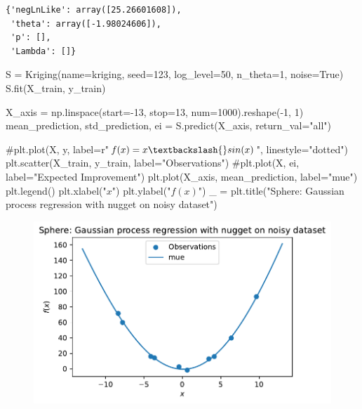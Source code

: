 \documentclass[
  letterpaper,
  DIV=11,
  numbers=noendperiod]{scrreprt}
\newenvironment{Shaded}{\begin{snugshade}}{\end{snugshade}}
\newcommand{\CommentTok}[1]{\textcolor[rgb]{0.37,0.37,0.37}{#1}}
\newcommand{\DecValTok}[1]{\textcolor[rgb]{0.68,0.00,0.00}{#1}}
\newcommand{\NormalTok}[1]{\textcolor[rgb]{0.00,0.23,0.31}{#1}}
\newcommand{\OperatorTok}[1]{\textcolor[rgb]{0.37,0.37,0.37}{#1}}
\newcommand{\StringTok}[1]{\textcolor[rgb]{0.13,0.47,0.30}{#1}}
\newcommand{\VariableTok}[1]{\textcolor[rgb]{0.07,0.07,0.07}{#1}}
\begin{document}
\begin{verbatim}
{'negLnLike': array([25.26601608]),
 'theta': array([-1.98024606]),
 'p': [],
 'Lambda': []}
\end{verbatim}

\begin{Shaded}
\begin{Highlighting}[]
\NormalTok{S }\OperatorTok{=}\NormalTok{ Kriging(name}\OperatorTok{=}\StringTok{\textquotesingle{}kriging\textquotesingle{}}\NormalTok{,}
\NormalTok{            seed}\OperatorTok{=}\DecValTok{123}\NormalTok{,}
\NormalTok{            log\_level}\OperatorTok{=}\DecValTok{50}\NormalTok{,}
\NormalTok{            n\_theta}\OperatorTok{=}\DecValTok{1}\NormalTok{,}
\NormalTok{            noise}\OperatorTok{=}\VariableTok{True}\NormalTok{)}
\NormalTok{S.fit(X\_train, y\_train)}

\NormalTok{X\_axis }\OperatorTok{=}\NormalTok{ np.linspace(start}\OperatorTok{={-}}\DecValTok{13}\NormalTok{, stop}\OperatorTok{=}\DecValTok{13}\NormalTok{, num}\OperatorTok{=}\DecValTok{1000}\NormalTok{).reshape(}\OperatorTok{{-}}\DecValTok{1}\NormalTok{, }\DecValTok{1}\NormalTok{)}
\NormalTok{mean\_prediction, std\_prediction, ei }\OperatorTok{=}\NormalTok{ S.predict(X\_axis, return\_val}\OperatorTok{=}\StringTok{"all"}\NormalTok{)}

\CommentTok{\#plt.plot(X, y, label=r"$f(x) = x \textbackslash{}sin(x)$", linestyle="dotted")}
\NormalTok{plt.scatter(X\_train, y\_train, label}\OperatorTok{=}\StringTok{"Observations"}\NormalTok{)}
\CommentTok{\#plt.plot(X, ei, label="Expected Improvement")}
\NormalTok{plt.plot(X\_axis, mean\_prediction, label}\OperatorTok{=}\StringTok{"mue"}\NormalTok{)}
\NormalTok{plt.legend()}
\NormalTok{plt.xlabel(}\StringTok{"$x$"}\NormalTok{)}
\NormalTok{plt.ylabel(}\StringTok{"$f(x)$"}\NormalTok{)}
\NormalTok{\_ }\OperatorTok{=}\NormalTok{ plt.title(}\StringTok{"Sphere: Gaussian process regression with nugget on noisy dataset"}\NormalTok{)}
\end{Highlighting}
\end{Shaded}

\begin{figure}[H]

{\centering \includegraphics{012_num_spot_ei_files/figure-pdf/cell-52-output-1.pdf}

}

\end{figure}
\end{document}

